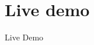 \documentclass[en]{sdqbeamer}
\begin{document}
\section{Live demo}
\begin{frame}
  \begin{center}
    \huge{Live Demo}
  \end{center}
\end{frame}
\end{document}
